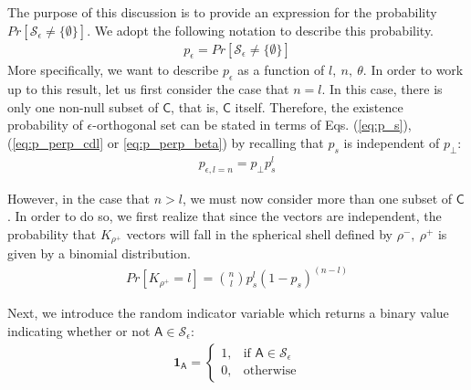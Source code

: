 The purpose of this discussion is to provide an expression for the probability $Pr[\mathscr{S}_\epsilon \neq \lbrace \emptyset \rbrace]$. We adopt the following notation to describe this probability.
 \begin{equation}\label{eq:p_epsilon}
    \begin{aligned}
        p_\epsilon = Pr[\mathscr{S}_\epsilon \neq \lbrace \emptyset \rbrace]
    \end{aligned}
\end{equation}
More specifically, we want to describe $p_\epsilon$ as a function of $l,\ n,\ \theta$. In order to work up to this result, let us first consider the case that $n=l$. In this case, there is only one non-null subset of $\mathsf{C}$, that is, $\mathsf{C}$ itself. Therefore, the existence probability of $\epsilon$-orthogonal set can be stated in terms of Eqs. (\ref{eq:p_s}), (\ref{eq:p_perp_cdl} or \ref{eq:p_perp_beta}) by recalling that $p_s$ is independent of $p_\perp$:
 \begin{equation}\label{eq:p_epsilon_l}
    \begin{aligned}
        p_{\epsilon,l=n} = p_\perp p_s^l
    \end{aligned}
\end{equation}

However, in the case that $n>l$, we must now consider more than one subset of $\mathsf{C}$. In order to do so, we first realize that since the vectors are independent, the probability that $K_{\rho^+}$ vectors will fall in the spherical shell defined by $\rho^-,\ \rho^+$ is given by a binomial distribution.
 \begin{equation}\label{eq:K_rho}
    \begin{aligned}
        Pr[K_{\rho^+} = l] = \binom{n}{l}p_s^l(1-p_s)^{(n-l)} 
    \end{aligned}
\end{equation}

Next, we introduce the random indicator variable which returns a binary value indicating whether or not $\mathsf{A}\in \mathscr{S}_\epsilon$:
 \begin{equation}\label{eq:orth_indicator}
    \begin{aligned}
        \textbf{1}_{\mathsf{A}} = 
        \begin{cases}
            1,& \text{if } \mathsf{A} \in \mathscr{S}_\epsilon\\
            0,              & \text{otherwise}
        \end{cases}
    \end{aligned}
\end{equation}

